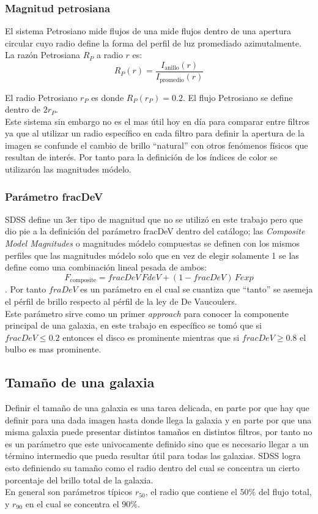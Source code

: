 \documentclass[twocolumn]{article}
\begin{document}
\subsubsection{Magnitud petrosiana}
El sistema Petrosiano \citep{1976ApJ...209L...1P} mide flujos de una mide flujos dentro de una apertura circular cuyo radio define la forma del perfil de luz promediado azimutalmente. La razón Petrosiana $R_P$ a radio $r$ es:
\begin{equation}
    R_P(r) = \frac{I_{\text{anillo}}(r)}{I_{\text{promedio}}(r)}
\end{equation}


El radio Petrosiano $r_P$ es donde $R_P(r_P) = 0.2$. El flujo Petrosiano se define dentro de $2r_P$.
\\

Este sistema sin embargo no es el mas útil hoy en día para comparar entre filtros ya que al utilizar un radio específico en cada filtro para definir la apertura de la imagen se confunde el cambio de brillo ``natural'' con otros fenómenos físicos que resultan de interés.  
Por tanto para la definición de los índices de color se utilizarón las magnitudes módelo.


\subsubsection{Parámetro fracDeV}
SDSS define un 3er tipo de magnitud que no se utilizó en este trabajo pero que dio pie a la definición del parámetro fracDeV dentro del catálogo; las \textit{Composite Model Magnitudes} o magnitudes módelo compuestas se definen con los mismos perfiles que las magnitudes módelo solo que en vez de elegir solamente 1 se las define como una combinación lineal pesada de ambos: \[F_{\text{composite}} = fracDeV \,FdeV + (1 - fracDeV)\,Fexp\]. 
Por tanto $fraDeV$ es un parámetro en el cual se cuantiza que ``tanto'' se asemeja el pérfil de brillo respecto al pérfil de la ley de De Vaucoulers.\\
Este parámetro sirve como un primer \textit{approach} para conocer la componente principal de una galaxia, en este trabajo en específico se tomó que si $fracDeV \leq 0.2$ entonces el disco es prominente mientras que si $fracDeV \geq 0.8$ el bulbo es mas prominente.


\subsection{Tamaño de una galaxia}
Definir el tamaño de una galaxia es una tarea delicada, en parte por que hay que definir para una dada imagen hasta donde llega la galaxia y en parte por que una misma galaxia puede presentar distintos tamaños en distintos filtros, por tanto no es un parámetro que este univocamente definido sino que es necesario llegar a un término intermedio que pueda resultar útil para todas las galaxias. 
SDSS logra esto definiendo su tamaño como el radio dentro del cual se concentra un cierto porcentaje del brillo total de la galaxia. \\
En general son parámetros típicos $r_{50}$, el radio que contiene el $50\%$ del flujo total, y $r_{90}$ en el cual se concentra el $90\%$.
\end{document}
